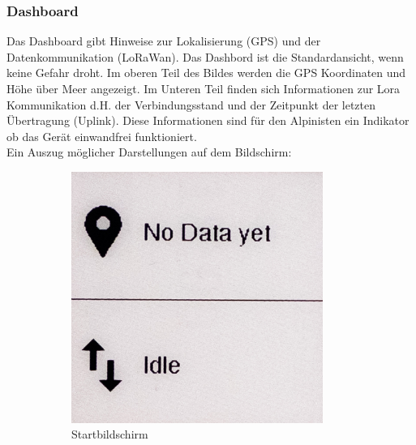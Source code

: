 \documentclass[11pt,english,german]{report}
\theoremstyle{definition}
\begin{document}
\subsubsection{Dashboard}
Das Dashboard gibt Hinweise zur Lokalisierung (GPS) und der Datenkommunikation (LoRaWan). Das Dashbord ist die Standardansicht, wenn keine Gefahr droht. Im oberen Teil des Bildes werden die GPS Koordinaten und Höhe über Meer angezeigt. Im Unteren Teil finden sich Informationen zur Lora Kommunikation d.H. der Verbindungsstand und der Zeitpunkt der letzten Übertragung (Uplink). Diese Informationen sind für den Alpinisten ein Indikator ob das Gerät einwandfrei funktioniert.\\[0.3cm]
Ein Auszug möglicher Darstellungen auf dem Bildschirm:
\begin{figure}[H]
	\centering
	\begin{subfigure}{.33\textwidth}
		\centering
		\includegraphics[width=0.9\textwidth]{img/prototype/dashboard_idle.jpg}
		\caption[Bildschrim - Start]
		{Startbildschirm}
	\end{subfigure}%
	\begin{subfigure}{.33\textwidth}
		\centering

\end{subfigure}
\end{figure}
\end{document}
